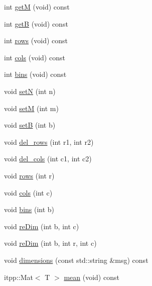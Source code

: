 \begin{DoxyCompactItemize}
\item 
int \mbox{\hyperlink{structSEMBLE_1_1SembleMatrix_a26d2ee5bf9ad9cb0fdd30bce5abadf92}{getM}} (void) const
\item 
int \mbox{\hyperlink{structSEMBLE_1_1SembleMatrix_aecff047627ee656c5836dcdf873c8ad6}{getB}} (void) const
\item 
int \mbox{\hyperlink{structSEMBLE_1_1SembleMatrix_a89cbc720521103b2a30228a3ca3b1e03}{rows}} (void) const
\item 
int \mbox{\hyperlink{structSEMBLE_1_1SembleMatrix_af0d467ec8fe85b4947556ad5d25bcda0}{cols}} (void) const
\item 
int \mbox{\hyperlink{structSEMBLE_1_1SembleMatrix_af79972f16dd8874677ed61b5bfdc7ed3}{bins}} (void) const
\item 
void \mbox{\hyperlink{structSEMBLE_1_1SembleMatrix_abd156f95830c6b27aac722d4346901cc}{setN}} (int n)
\item 
void \mbox{\hyperlink{structSEMBLE_1_1SembleMatrix_acbb4c25efd64633247fc6119a0d427ca}{setM}} (int m)
\item 
void \mbox{\hyperlink{structSEMBLE_1_1SembleMatrix_a3efa5315ec7e5fd9491e5904479c82ec}{setB}} (int b)
\item 
void \mbox{\hyperlink{structSEMBLE_1_1SembleMatrix_a648b1088d29de6b44ca6508492939b42}{del\+\_\+rows}} (int r1, int r2)
\item 
void \mbox{\hyperlink{structSEMBLE_1_1SembleMatrix_a6e73d380227b99dd131a8c39742734a0}{del\+\_\+cols}} (int c1, int c2)
\item 
void \mbox{\hyperlink{structSEMBLE_1_1SembleMatrix_aa489bc3fac488706d97e78519e7334df}{rows}} (int r)
\item 
void \mbox{\hyperlink{structSEMBLE_1_1SembleMatrix_a06252460e771d092f72f9d7dfee55084}{cols}} (int c)
\item 
void \mbox{\hyperlink{structSEMBLE_1_1SembleMatrix_ae3efc835049db0182eaf149bcbf9d142}{bins}} (int b)
\item 
void \mbox{\hyperlink{structSEMBLE_1_1SembleMatrix_a376b3b7cc061b6d20370cb78ade11b0e}{re\+Dim}} (int b, int c)
\item 
void \mbox{\hyperlink{structSEMBLE_1_1SembleMatrix_a9bb9814650ff3bd6c43656781811391b}{re\+Dim}} (int b, int r, int c)
\item 
void \mbox{\hyperlink{structSEMBLE_1_1SembleMatrix_ab778c582ca37ce69f2f9ab1074af0ca6}{dimensions}} (const std\+::string \&msg) const
\item 
itpp\+::\+Mat$<$ T $>$ \mbox{\hyperlink{structSEMBLE_1_1SembleMatrix_a0013e054dd36b47be4616b828c0ef19d}{mean}} (void) const

\end{DoxyCompactItemize}
